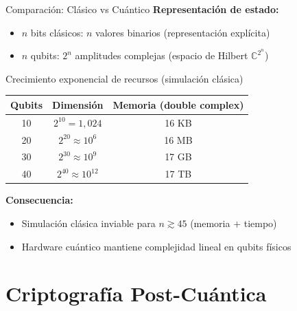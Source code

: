 \documentclass[aspectratio=169]{beamer}
\begin{document}
\begin{frame}{Comparación: Clásico vs Cuántico}
\textbf{Representación de estado:}
\begin{itemize}
\item $n$ bits clásicos: $n$ valores binarios (representación explícita)
\item $n$ qubits: $2^n$ amplitudes complejas (espacio de Hilbert $\mathbb{C}^{2^n}$)
\end{itemize}

\vspace{0.3cm}
\begin{block}{Crecimiento exponencial de recursos (simulación clásica)}
\begin{center}
\begin{tabular}{|c|c|c|}
\hline
\textbf{Qubits} & \textbf{Dimensión} & \textbf{Memoria (double complex)} \\
\hline
10 & $2^{10} = 1,024$ & 16 KB \\
20 & $2^{20} \approx 10^6$ & 16 MB \\
30 & $2^{30} \approx 10^9$ & 17 GB \\
40 & $2^{40} \approx 10^{12}$ & 17 TB \\
\hline
\end{tabular}
\end{center}
\end{block}

\vspace{0.3cm}
\textbf{Consecuencia:}
\begin{itemize}
\item Simulación clásica inviable para $n \gtrsim 45$ (memoria + tiempo)
\item Hardware cuántico mantiene complejidad lineal en qubits físicos
\end{itemize}
\end{frame}

\section{Criptografía Post-Cuántica}
\end{document}
